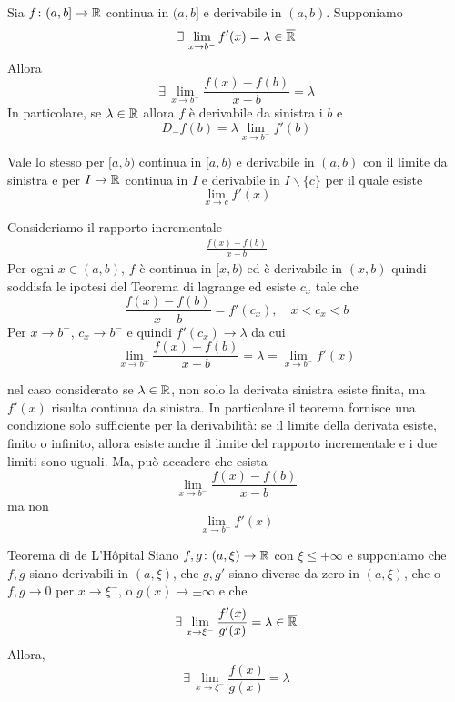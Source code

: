 \documentclass[a4paper]{article}
\begin{document}
\begin{snippettheorem}{}
    Sia \(f \colon (a, b] \to \mathbb{R}\) continua in \((a,b]\)
    e derivabile in \((a,b)\).
    Supponiamo
    \[
        \exists\,\lim_{x\to b^-} f'(x) = \lambda \in \overline{\mathbb{R}}
    \]
    Allora
    \[
        \exists\,\lim_{x\to b^-} \frac{f(x) - f(b)}{x-b} = \lambda
    \]
    In particolare, se \(\lambda \in \mathbb{R}\) allora \(f\) è derivabile da sinistra i \(b\)
    e
    \[
        D_-f(b) = \lambda \lim_{x \to b^-} f'(b)
    \]
\end{snippettheorem}

Vale lo stesso per \([a,b)\) continua in \([a,b)\) e derivabile in \((a,b)\)
con il limite da sinistra e per \(I \to \mathbb{R}\) continua in \(I\) e derivabile
in \(I\backslash\{c\}\) per il quale esiste
\[
    \lim_{x\to c}f'(x)
\]

\begin{snippetproof}{}
    Consideriamo il rapporto incrementale
    \begin{align*}
        \frac{f(x) - f(b)}{x-b}
    \end{align*}
    Per ogni \(x\in(a,b)\), \(f\) è continua in \([x, b)\) ed è derivabile in \((x,b)\)
    quindi soddisfa le ipotesi del Teorema di lagrange ed esiste \(c_x\) tale che
    \[
        \frac{f(x) - f(b)}{x-b} = f'(c_x), \quad x < c_x < b
    \]
    Per \(x\to b^-\), \(c_x\to b^-\) e quindi \(f'(c_x) \to \lambda\) da cui
    \[
        \lim_{x\to b^-} \frac{f(x) - f(b)}{x-b} = \lambda = \lim_{x \to b^-} f'(x)
    \]
\end{snippetproof}

nel caso considerato se \(\lambda \in \mathbb{R}\), non solo la derivata sinistra esiste finita, ma \(f'(x)\)
risulta continua da sinistra.
In particolare il teorema fornisce una condizione solo sufficiente per la derivabilità:
se il limite della derivata esiste, finito o infinito, allora
esiste anche il limite del rapporto incrementale e i due limiti sono uguali.
Ma, può accadere che esista \[
    \lim_{x\to b^-} \frac{f(x) - f(b)}{x-b}
\]
ma non
\[
    \lim_{x\to b^-} f'(x)
\]

\begin{snippettheorem}{Teorema di de L'Hôpital}
    Siano \(f, g \colon (a, \xi) \to \mathbb{R}\) con \(\xi \leq +\infty\)
    e supponiamo che \(f,g\) siano derivabili in \((a,\xi)\), che \(g, g'\)
    siano diverse da zero in \((a, \xi)\), che o
    \(f,g \to 0\) per \(x\to \xi^-\),
    o \(g(x) \to \pm \infty\) e che
    \[
        \exists\, \lim_{x \to \xi^-} \frac{f'(x)}{g'(x)} = \lambda \in \overline{\mathbb{R}}
    \]
    Allora,
    \[
        \exists\, \lim_{x \to \xi^-} \frac{f(x)}{g(x)} = \lambda
    \]
\end{snippettheorem}
\end{document}
